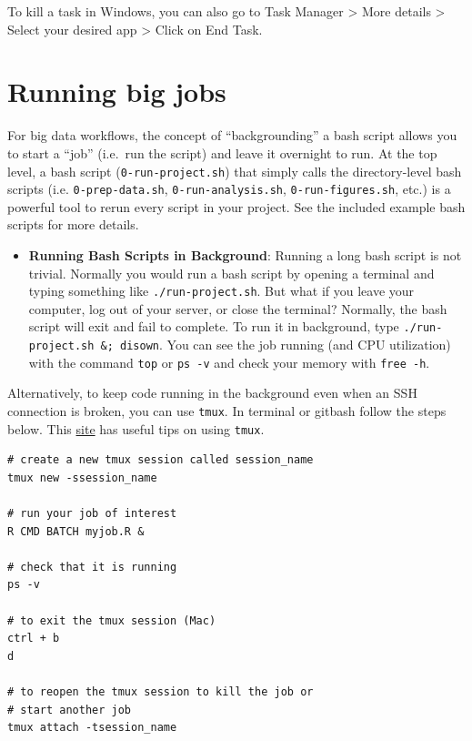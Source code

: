 \documentclass[]{book}
\providecommand{\tightlist}{%
  \setlength{\itemsep}{0pt}\setlength{\parskip}{0pt}}
\begin{document}
To kill a task in Windows, you can also go to Task Manager \textgreater{} More details \textgreater{} Select your desired app \textgreater{} Click on End Task.

\hypertarget{running-big-jobs}{%
\section{Running big jobs}\label{running-big-jobs}}

For big data workflows, the concept of ``backgrounding'' a bash script allows you to start a ``job'' (i.e.~run the script) and leave it overnight to run. At the top level, a bash script (\texttt{0-run-project.sh}) that simply calls the directory-level bash scripts (i.e. \texttt{0-prep-data.sh}, \texttt{0-run-analysis.sh}, \texttt{0-run-figures.sh}, etc.) is a powerful tool to rerun every script in your project. See the included example bash scripts for more details.

\begin{itemize}
\tightlist
\item
  \textbf{Running Bash Scripts in Background}: Running a long bash script is not trivial. Normally you would run a bash script by opening a terminal and typing something like \texttt{./run-project.sh}. But what if you leave your computer, log out of your server, or close the terminal? Normally, the bash script will exit and fail to complete. To run it in background, type \texttt{./run-project.sh\ \&;\ disown}. You can see the job running (and CPU utilization) with the command \texttt{top} or \texttt{ps\ -v} and check your memory with \texttt{free\ -h}.
\end{itemize}

Alternatively, to keep code running in the background even when an SSH connection is broken, you can use \texttt{tmux}. In terminal or gitbash follow the steps below. This \href{https://medium.com/@jeongwhanchoi/install-tmux-on-osx-and-basics-commands-for-beginners-be22520fd95e}{site} has useful tips on using \texttt{tmux}.

\begin{verbatim}
# create a new tmux session called session_name
tmux new -ssession_name

# run your job of interest
R CMD BATCH myjob.R & 
  
# check that it is running
ps -v

# to exit the tmux session (Mac)
ctrl + b 
d

# to reopen the tmux session to kill the job or 
# start another job
tmux attach -tsession_name 
\end{verbatim}
\end{document}
